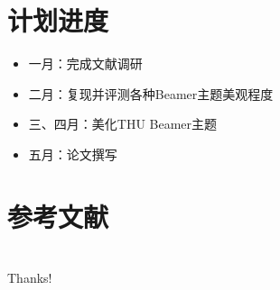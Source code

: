 \documentclass[10pt,aspectratio=43,mathserif]{beamer}
\begin{document}
\section{计划进度}
\begin{frame}
  \begin{itemize}
    \item 一月：完成文献调研
    \item 二月：复现并评测各种Beamer主题美观程度
    \item 三、四月：美化THU Beamer主题
    \item 五月：论文撰写
\end{itemize}
\end{frame}

\section*{参考文献}
\begin{frame}
\end{frame}

\section*{}
\begin{frame}
  \begin{center}
      {\Huge\calligra Thanks!}
  \end{center}
\end{frame}
\end{document}
